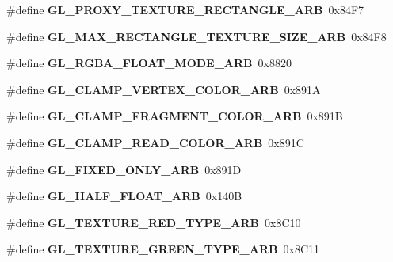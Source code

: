\begin{DoxyCompactItemize}
\item 
\#define {\bfseries G\+L\+\_\+\+P\+R\+O\+X\+Y\+\_\+\+T\+E\+X\+T\+U\+R\+E\+\_\+\+R\+E\+C\+T\+A\+N\+G\+L\+E\+\_\+\+A\+R\+B}~0x84\+F7\label{_s_d_l__opengl_8h_a75556b084a48e5d09d481b49d33a01ac}

\item 
\#define {\bfseries G\+L\+\_\+\+M\+A\+X\+\_\+\+R\+E\+C\+T\+A\+N\+G\+L\+E\+\_\+\+T\+E\+X\+T\+U\+R\+E\+\_\+\+S\+I\+Z\+E\+\_\+\+A\+R\+B}~0x84\+F8\label{_s_d_l__opengl_8h_a1a990f79c906e2f5ecfd72bb915c6848}

\item 
\#define {\bfseries G\+L\+\_\+\+R\+G\+B\+A\+\_\+\+F\+L\+O\+A\+T\+\_\+\+M\+O\+D\+E\+\_\+\+A\+R\+B}~0x8820\label{_s_d_l__opengl_8h_a8c38f1b9248d4cc621903cf296d5be6a}

\item 
\#define {\bfseries G\+L\+\_\+\+C\+L\+A\+M\+P\+\_\+\+V\+E\+R\+T\+E\+X\+\_\+\+C\+O\+L\+O\+R\+\_\+\+A\+R\+B}~0x891\+A\label{_s_d_l__opengl_8h_a162101bb0d95733885e9a17320810892}

\item 
\#define {\bfseries G\+L\+\_\+\+C\+L\+A\+M\+P\+\_\+\+F\+R\+A\+G\+M\+E\+N\+T\+\_\+\+C\+O\+L\+O\+R\+\_\+\+A\+R\+B}~0x891\+B\label{_s_d_l__opengl_8h_a15588d12f81c584b38ca1eb1a3915842}

\item 
\#define {\bfseries G\+L\+\_\+\+C\+L\+A\+M\+P\+\_\+\+R\+E\+A\+D\+\_\+\+C\+O\+L\+O\+R\+\_\+\+A\+R\+B}~0x891\+C\label{_s_d_l__opengl_8h_aef0447e2b4b0129865639b38175cc102}

\item 
\#define {\bfseries G\+L\+\_\+\+F\+I\+X\+E\+D\+\_\+\+O\+N\+L\+Y\+\_\+\+A\+R\+B}~0x891\+D\label{_s_d_l__opengl_8h_a48400d825fd69d2d826fc252ffbdd315}

\item 
\#define {\bfseries G\+L\+\_\+\+H\+A\+L\+F\+\_\+\+F\+L\+O\+A\+T\+\_\+\+A\+R\+B}~0x140\+B\label{_s_d_l__opengl_8h_aae212f7434dae4eb914939d36e2f8caa}

\item 
\#define {\bfseries G\+L\+\_\+\+T\+E\+X\+T\+U\+R\+E\+\_\+\+R\+E\+D\+\_\+\+T\+Y\+P\+E\+\_\+\+A\+R\+B}~0x8\+C10\label{_s_d_l__opengl_8h_ad2d20d37b2195b0eaefc2587ff64a5a2}

\item 
\#define {\bfseries G\+L\+\_\+\+T\+E\+X\+T\+U\+R\+E\+\_\+\+G\+R\+E\+E\+N\+\_\+\+T\+Y\+P\+E\+\_\+\+A\+R\+B}~0x8\+C11\label{_s_d_l__opengl_8h_a66fe3f1c6d18d5ad4630ec0f9090fe9f}


\end{DoxyCompactItemize}

